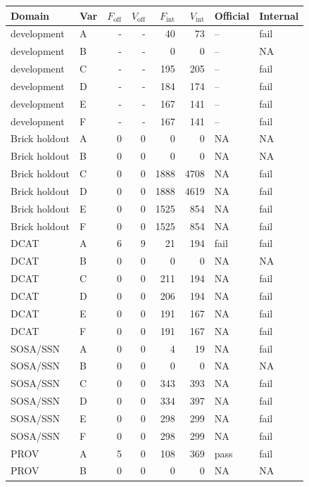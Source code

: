 \begin{tabular}{llrrrrll}
\hline
Domain & Var & $F_{\mathrm{off}}$ & $V_{\mathrm{off}}$ & $F_{\mathrm{int}}$ & $V_{\mathrm{int}}$ & Official & Internal \\ \hline
development & A & - & - & 40 & 73 & -- & fail \\
development & B & - & - & 0 & 0 & -- & NA \\
development & C & - & - & 195 & 205 & -- & fail \\
development & D & - & - & 184 & 174 & -- & fail \\
development & E & - & - & 167 & 141 & -- & fail \\
development & F & - & - & 167 & 141 & -- & fail \\
Brick holdout & A & 0 & 0 & 0 & 0 & NA & NA \\
Brick holdout & B & 0 & 0 & 0 & 0 & NA & NA \\
Brick holdout & C & 0 & 0 & 1888 & 4708 & NA & fail \\
Brick holdout & D & 0 & 0 & 1888 & 4619 & NA & fail \\
Brick holdout & E & 0 & 0 & 1525 & 854 & NA & fail \\
Brick holdout & F & 0 & 0 & 1525 & 854 & NA & fail \\
DCAT & A & 6 & 9 & 21 & 194 & fail & fail \\
DCAT & B & 0 & 0 & 0 & 0 & NA & NA \\
DCAT & C & 0 & 0 & 211 & 194 & NA & fail \\
DCAT & D & 0 & 0 & 206 & 194 & NA & fail \\
DCAT & E & 0 & 0 & 191 & 167 & NA & fail \\
DCAT & F & 0 & 0 & 191 & 167 & NA & fail \\
SOSA/SSN & A & 0 & 0 & 4 & 19 & NA & fail \\
SOSA/SSN & B & 0 & 0 & 0 & 0 & NA & NA \\
SOSA/SSN & C & 0 & 0 & 343 & 393 & NA & fail \\
SOSA/SSN & D & 0 & 0 & 334 & 397 & NA & fail \\
SOSA/SSN & E & 0 & 0 & 298 & 299 & NA & fail \\
SOSA/SSN & F & 0 & 0 & 298 & 299 & NA & fail \\
PROV & A & 5 & 0 & 108 & 369 & pass & fail \\
PROV & B & 0 & 0 & 0 & 0 & NA & NA \\

\end{tabular}
